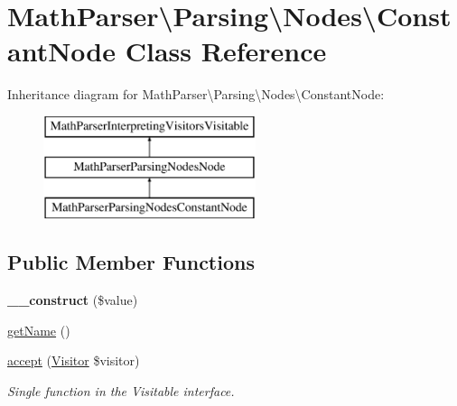 \hypertarget{classMathParser_1_1Parsing_1_1Nodes_1_1ConstantNode}{\section{Math\-Parser\textbackslash{}Parsing\textbackslash{}Nodes\textbackslash{}Constant\-Node Class Reference}
\label{classMathParser_1_1Parsing_1_1Nodes_1_1ConstantNode}
}
Inheritance diagram for Math\-Parser\textbackslash{}Parsing\textbackslash{}Nodes\textbackslash{}Constant\-Node\-:\begin{figure}[H]
\begin{center}
\leavevmode
\includegraphics[height=3.000000cm]{classMathParser_1_1Parsing_1_1Nodes_1_1ConstantNode}
\end{center}
\end{figure}
\subsection*{Public Member Functions}
\begin{DoxyCompactItemize}
\item 
\hypertarget{classMathParser_1_1Parsing_1_1Nodes_1_1ConstantNode_a2ad61188ed04bb2fd99dda2db380afbd}{{\bfseries \-\_\-\-\_\-construct} (\$value)}\label{classMathParser_1_1Parsing_1_1Nodes_1_1ConstantNode_a2ad61188ed04bb2fd99dda2db380afbd}

\item 
\hyperlink{classMathParser_1_1Parsing_1_1Nodes_1_1ConstantNode_a537089b5aa92491a904193f449318090}{get\-Name} ()
\item 
\hyperlink{classMathParser_1_1Parsing_1_1Nodes_1_1ConstantNode_a5debc023d33ccf262a4c73569b4af841}{accept} (\hyperlink{interfaceMathParser_1_1Interpreting_1_1Visitors_1_1Visitor}{Visitor} \$visitor)
\begin{DoxyCompactList}\small\item\em Single function in the Visitable interface. \end{DoxyCompactList}\end{DoxyCompactItemize}
